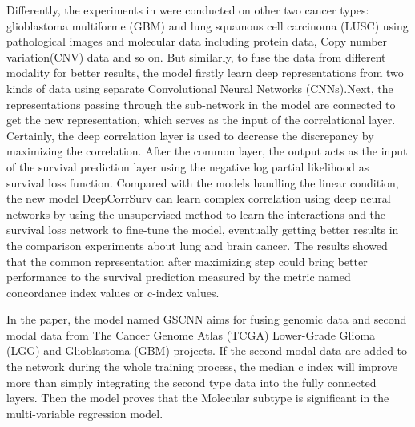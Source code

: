 \documentclass[journal,twoside,web]{ieeecolor}
\begin{document}
Differently, the experiments in \cite{yao2017deep} were conducted on other two cancer types: glioblastoma multiforme (GBM) and lung squamous cell carcinoma (LUSC) using pathological images and molecular data including protein data, Copy number variation(CNV) data and so on. 
But similarly, to fuse the data from different modality for better results, the model firstly learn deep representations from two kinds of data using separate Convolutional Neural Networks (CNNs).Next, the representations passing through the sub-network in the model are connected to get the new representation, which serves as the input of the correlational layer.
Certainly, the deep correlation layer is used to decrease the discrepancy by maximizing the correlation.
After the common layer, the output acts as the input of the survival prediction layer using the negative log partial likelihood as survival loss function.
Compared with the models handling the linear condition, the new model DeepCorrSurv can learn complex correlation using deep neural networks by using the unsupervised method to learn the interactions and the survival loss network to fine-tune the model, eventually getting better results in the comparison experiments about lung and brain cancer.
The results showed that the common representation after maximizing step could bring better performance to the survival prediction measured by the metric named concordance index values or c-index values.

In the paper\cite{mobadersany2018predicting}, the model named GSCNN aims for fusing genomic data and second modal data from The Cancer Genome Atlas (TCGA) Lower-Grade Glioma (LGG) and Glioblastoma (GBM) projects. 
If the second modal data are added to the network during the whole training process, the median c index will improve more than simply integrating the second type data into the fully connected layers. Then the model proves that the Molecular subtype is significant in the multi-variable regression model.
\end{document}
